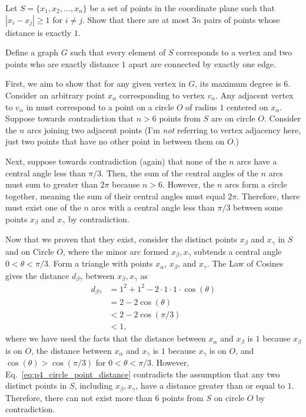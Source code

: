 \documentclass[12pt]{extarticle}
\begin{document}
\begin{prob} \label{prob:problem_4}
	Let $S = \{x_1, x_2, \ldots, x_n\}$ be a set of points in the coordinate plane such that $|x_i - x_j| \geq 1$ for $i \neq j$. Show that there are at most $3n$ pairs of points whose distance is exactly $1$.
\end{prob}

\begin{sol} \label{sol:solution_4}
	Define a graph $G$ such that every element of $S$ corresponds to a vertex and two points who are exactly distance $1$ apart are connected by exactly one edge.

	First, we aim to show that for any given vertex in $G$, its maximum degree is $6$.
	Consider an arbitrary point $x_\alpha$ corresponding to vertex $v_\alpha$.
	Any adjacent vertex to $v_\alpha$ in must correspond to a point on a circle $O$ of radius $1$ centered on $x_\alpha$.
	Suppose towards contradiction that $n > 6$ points from $S$ are on circle $O$.
	Consider the $n$ arcs joining two adjacent points (I'm \emph{not} referring to vertex adjacency here, just two points that have no other point in between them on $O$.)

	Next, suppose towards contradiction (again) that none of the $n$ arcs have a central angle less than $\pi / 3$.
	Then, the sum of the central angles of the $n$ arcs must sum to greater than $2\pi$ because $n > 6$.
	However, the $n$ arcs form a circle together, meaning the sum of their central angles must equal $2\pi$.
	Therefore, there must exist one of the $n$ arcs with a central angle less than $\pi / 3$ between some points $x_\beta$ and $x_\gamma$ by contradiction.

	Now that we proven that they exist, consider the distinct points $x_\beta$ and $x_\gamma$ in $S$ and on Circle $O$, where the minor arc formed $x_\beta, x_\gamma$ subtends a central angle $0 < \theta < \pi / 3$.
	Form a triangle with points $x_\alpha$, $x_\beta$, and $x_\gamma$.
	The Law of Cosines gives the distance $d_{\beta\gamma}$ between $x_\beta, x_\gamma$ as
	\begin{align}
		d_{\beta\gamma} & = 1^2 + 1^2 - 2 \cdot 1 \cdot 1 \cdot \cos(\theta) \\
		                & = 2 - 2\cos(\theta)                                \\
		                & < 2 - 2\cos(\pi / 3)                               \\
		                & < 1, \label{eq:p4_circle_point_distance}
	\end{align}
	where we have used the facts that the distance between $x_\alpha$ and $x_\beta$ is $1$ because $x_\beta$ is on $O$, the distance between $x_\alpha$ and $x_\gamma$ is $1$ because $x_\gamma$ is on $O$, and $\cos(\theta) > \cos(\pi / 3)$ for $0 < \theta < \pi / 3$.
	However, Eq.~\eqref{eq:p4_circle_point_distance} contradicts the assumption that any two distinct points in $S$, including $x_\beta, x_\gamma$, have a distance greater than or equal to $1$.
	Therefore, there can not exist more than $6$ points from $S$ on circle $O$ by contradiction.


\end{sol}
\end{document}

